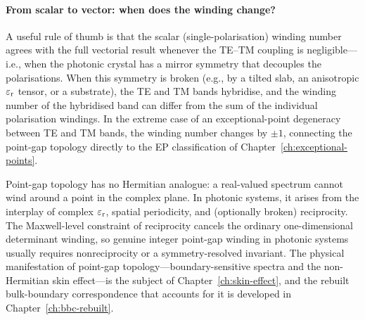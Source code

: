 \paragraph{From scalar to vector: when does the winding change?}
A useful rule of thumb is that the scalar (single-polarisation)
winding number agrees with the full vectorial result whenever
the TE--TM coupling is negligible---i.e., when the photonic crystal has
a mirror symmetry that decouples the polarisations. When this symmetry
is broken (e.g., by a tilted slab, an anisotropic $\varepsilon_{\mathrm{r}}$ tensor, or
a substrate), the TE and TM bands hybridise, and the winding number of
the hybridised band can differ from the sum of the individual
polarisation windings. In the extreme case of an exceptional-point
degeneracy between TE and TM bands, the winding number changes by
$\pm 1$, connecting the point-gap topology directly to the EP
classification of Chapter~\ref{ch:exceptional-points}.


\begin{takeaway}
Point-gap topology has no Hermitian analogue: a real-valued spectrum
cannot wind around a point in the complex plane. In photonic systems,
it arises from the interplay of complex $\varepsilon_{\mathrm{r}}$, spatial periodicity,
and (optionally broken) reciprocity. The Maxwell-level constraint of
reciprocity cancels the ordinary one-dimensional determinant winding,
so genuine integer point-gap winding in photonic systems usually
requires nonreciprocity or a symmetry-resolved invariant. The physical
manifestation of point-gap topology---boundary-sensitive spectra and
the non-Hermitian skin effect---is the subject of
Chapter~\ref{ch:skin-effect}, and the rebuilt bulk-boundary
correspondence that accounts for it is developed in
Chapter~\ref{ch:bbc-rebuilt}.
\end{takeaway}
